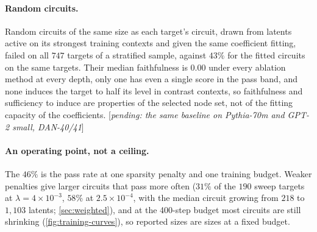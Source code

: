 \documentclass[10pt]{article}
\newcommand{\pending}[1]{\textcolor{red!70!black}{[\textit{pending: #1}]}}
\begin{document}
\paragraph{Random circuits.}
Random circuits of the same size as each target's circuit, drawn from latents active on its strongest training contexts and given the same coefficient fitting, failed on all $747$ targets of a stratified sample, against $43\%$ for the fitted circuits on the same targets.
Their median faithfulness is $0.00$ under every ablation method at every depth, only one has even a single score in the pass band, and none induces the target to half its level in contrast contexts, so faithfulness and sufficiency to induce are properties of the selected node set, not of the fitting capacity of the coefficients.
\pending{the same baseline on Pythia-70m and GPT-2 small, DAN-40/41}

\paragraph{An operating point, not a ceiling.}
The $46\%$ is the pass rate at one sparsity penalty and one training budget.
Weaker penalties give larger circuits that pass more often ($31\%$ of the $190$ sweep targets at $\lambda = 4 \times 10^{-3}$, $58\%$ at $2.5 \times 10^{-4}$, with the median circuit growing from $218$ to $1{,}103$ latents; \cref{sec:weighted}), and at the 400-step budget most circuits are still shrinking (\cref{fig:training-curves}), so reported sizes are sizes at a fixed budget.
\end{document}

